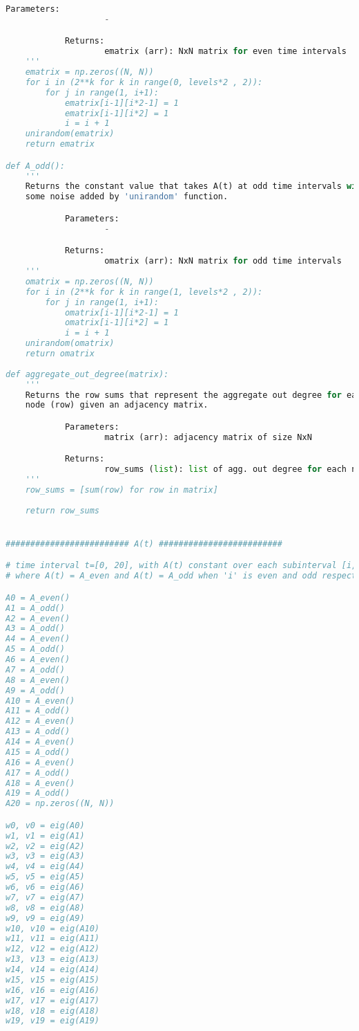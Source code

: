 \begin{lstlisting}[language=Python, caption=First synthetic experiment]
            Parameters:
                    -

            Returns:
                    ematrix (arr): NxN matrix for even time intervals
    '''
    ematrix = np.zeros((N, N))
    for i in (2**k for k in range(0, levels*2 , 2)):
        for j in range(1, i+1):
            ematrix[i-1][i*2-1] = 1
            ematrix[i-1][i*2] = 1
            i = i + 1
    unirandom(ematrix)
    return ematrix

def A_odd():
    '''
    Returns the constant value that takes A(t) at odd time intervals with 
    some noise added by 'unirandom' function.

            Parameters:
                    -

            Returns:
                    omatrix (arr): NxN matrix for odd time intervals
    '''
    omatrix = np.zeros((N, N))
    for i in (2**k for k in range(1, levels*2 , 2)):
        for j in range(1, i+1):
            omatrix[i-1][i*2-1] = 1
            omatrix[i-1][i*2] = 1
            i = i + 1
    unirandom(omatrix)
    return omatrix
   
def aggregate_out_degree(matrix):
    '''
    Returns the row sums that represent the aggregate out degree for each
    node (row) given an adjacency matrix.

            Parameters:
                    matrix (arr): adjacency matrix of size NxN

            Returns:
                    row_sums (list): list of agg. out degree for each node
    '''
    row_sums = [sum(row) for row in matrix]
    
    return row_sums


######################### A(t) #########################

# time interval t=[0, 20], with A(t) constant over each subinterval [i, i + 1)
# where A(t) = A_even and A(t) = A_odd when 'i' is even and odd respectively

A0 = A_even()
A1 = A_odd()
A2 = A_even()
A3 = A_odd()
A4 = A_even()
A5 = A_odd()
A6 = A_even()
A7 = A_odd()
A8 = A_even()
A9 = A_odd()
A10 = A_even()
A11 = A_odd()
A12 = A_even()
A13 = A_odd()
A14 = A_even()
A15 = A_odd()
A16 = A_even()
A17 = A_odd()
A18 = A_even()
A19 = A_odd()
A20 = np.zeros((N, N))

w0, v0 = eig(A0)
w1, v1 = eig(A1)
w2, v2 = eig(A2)
w3, v3 = eig(A3)
w4, v4 = eig(A4)
w5, v5 = eig(A5)
w6, v6 = eig(A6)
w7, v7 = eig(A7)
w8, v8 = eig(A8)
w9, v9 = eig(A9)
w10, v10 = eig(A10)
w11, v11 = eig(A11)
w12, v12 = eig(A12)
w13, v13 = eig(A13)
w14, v14 = eig(A14)
w15, v15 = eig(A15)
w16, v16 = eig(A16)
w17, v17 = eig(A17)
w18, v18 = eig(A18)
w19, v19 = eig(A19)


\end{lstlisting}
